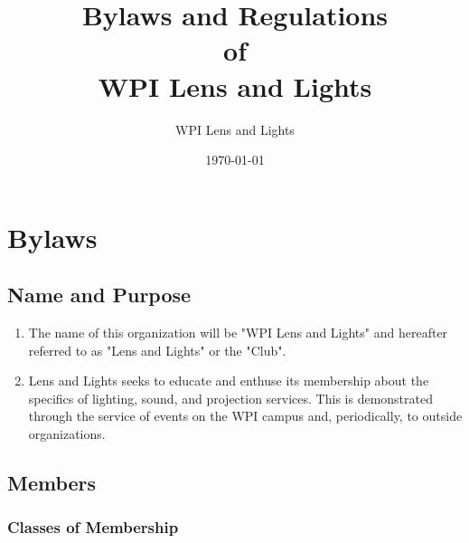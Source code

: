 \documentclass[12pt,letterpaper,oneside]{book}
\title{Bylaws and Regulations \\ of \\ WPI Lens and Lights}
\author{WPI Lens and Lights}
\date{\today}
\begin{document}
\maketitle

\tableofcontents
\newpage

\part{Bylaws}

\renewcommand{\chaptername}{Article}

\chapter{Name and Purpose}

\begin{enumerate}

\item The name of this organization will be "WPI Lens and Lights" and hereafter referred to as "Lens and Lights" or the "Club".
\item Lens and Lights seeks to educate and enthuse its membership about the specifics of lighting, sound, and projection services. This is demonstrated through the service of events on the WPI campus and, periodically, to outside organizations.


\end{enumerate}

\chapter{Members}

\section{Classes of Membership} \label{sec:classesofmembership}
\end{document}
